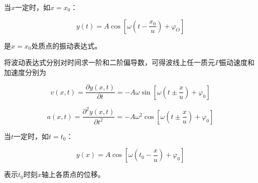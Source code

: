 \documentclass[12pt, a4paper]{article}
\numberwithin{equation}{section}
\begin{document}
    当\(x \)一定时，如\(x = x_0\)：

    \begin{equation}
        y(t)=A \cos \left[\omega\left(t-\frac{x_0}{u}\right)+\varphi_O\right]
    \end{equation}

    是\(x = x_0\)处质点的振动表达式。

    将波动表达式分别对时间求一阶和二阶偏导数，可得波线上任一质元\(P\)振动速度和加速度分别为

    \begin{equation}
        v(x, t)=\frac{\partial y(x, t)}{\partial t}=-A \omega \sin \left[\omega\left(t \pm \frac{x}{u}\right)+\varphi_0\right]
    \end{equation}
    
    \begin{equation}
        a(x, t)=\frac{\partial^2 y(x, t)}{\partial t^2}=-A \omega^2 \cos \left[\omega\left(t \pm \frac{x}{u}\right)+\varphi_0\right]
    \end{equation}
    
    \vspace{1em}

    当\(t \)一定时，如\(t = t_0\)：

    \begin{equation}
        y(x)=A \cos \left[\omega\left(t_0-\frac{x}{u}\right)+\varphi_0\right]
    \end{equation}

    表示\(t_0\)时刻\(x\)轴上各质点的位移。
\end{document}
